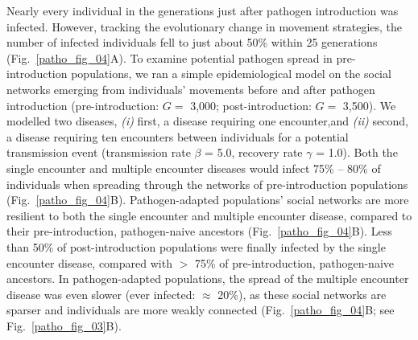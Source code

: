 Nearly every individual in the generations just after pathogen introduction was infected.
However, tracking the evolutionary change in movement strategies, the number of infected individuals fell to just about 50\% within 25 generations (Fig.~\ref{patho_fig_04}A).
To examine potential pathogen spread in pre-introduction populations, we ran a simple epidemiological model on the social networks emerging from individuals' movements before and after pathogen introduction (pre-introduction: $G =$ 3,000; post-introduction: $G =$ 3,500).
We modelled two diseases, \textit{(i)} first, a disease requiring one encounter,and \textit{(ii)} second, a disease requiring ten encounters between individuals for a potential transmission event (transmission rate $\beta$ = 5.0, recovery rate $\gamma$ = 1.0).
Both the single encounter and multiple encounter diseases would infect 75\% -- 80\% of individuals when spreading through the networks of pre-introduction populations (Fig.~\ref{patho_fig_04}B).
Pathogen-adapted populations' social networks are more resilient to both the single encounter and multiple encounter disease, compared to their pre-introduction, pathogen-naive ancestors (Fig.~\ref{patho_fig_04}B).
Less than 50\% of post-introduction populations were finally infected by the single encounter disease, compared with $>$ 75\% of pre-introduction, pathogen-naive ancestors.
In pathogen-adapted populations, the spread of the multiple encounter disease was even slower (ever infected: $\approx$ 20\%), as these social networks are sparser and individuals are more weakly connected (Fig.~\ref{patho_fig_04}B; see Fig.~\ref{patho_fig_03}B).

